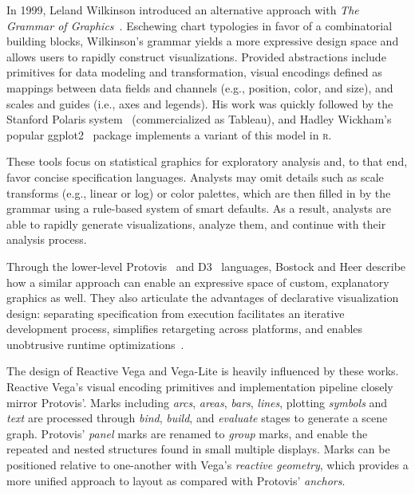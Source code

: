 In 1999, Leland Wilkinson introduced an alternative approach with \emph{The
Grammar of Graphics}~\cite{wilkinson:grammar}. Eschewing chart typologies in
favor of a combinatorial building blocks, Wilkinson's grammar yields a more
expressive design space and allows users to rapidly construct visualizations.
Provided abstractions include primitives for data modeling and transformation,
visual encodings defined as mappings between data fields and channels (e.g.,
position, color, and size), and scales and guides (i.e., axes and legends). His
work was quickly followed by the Stanford Polaris system~\cite{stolte:polaris}
(commercialized as Tableau), and Hadley Wickham's popular
ggplot2~\cite{wickham:layered} package implements a variant of this model in
\textsc{r}.

These tools focus on statistical graphics for exploratory analysis and, to that
end, favor concise specification languages. Analysts may omit details such as
scale transforms (e.g., linear or log) or color palettes, which are then filled
in by the grammar using a rule-based system of smart defaults. As a result,
analysts are able to rapidly generate visualizations, analyze them, and continue
with their analysis process.

Through the lower-level Protovis~\cite{bostock:protovis,heer:protovisjava} and
D3~\cite{bostock:d3} languages, Bostock and Heer describe how a similar approach
can enable an expressive space of custom, explanatory graphics as well. They
also articulate the advantages of declarative visualization design: separating
specification from execution facilitates an iterative development process,
simplifies retargeting across platforms, and enables unobtrusive runtime
optimizations~\cite{heer:protovisjava}.

The design of Reactive Vega and Vega-Lite is heavily influenced by these works.
Reactive Vega's visual encoding primitives and implementation pipeline closely
mirror Protovis'. Marks including \emph{arcs}, \emph{areas}, \emph{bars},
\emph{lines}, plotting \emph{symbols} and \emph{text} are processed through
\emph{bind}, \emph{build}, and \emph{evaluate} stages to generate a scene graph.
Protovis' \emph{panel} marks are renamed to \emph{group} marks, and enable the
repeated and nested structures found in small multiple displays. Marks can be
positioned relative to one-another with Vega's \emph{reactive geometry}, which
provides a more unified approach to layout as compared with Protovis'
\emph{anchors}.

